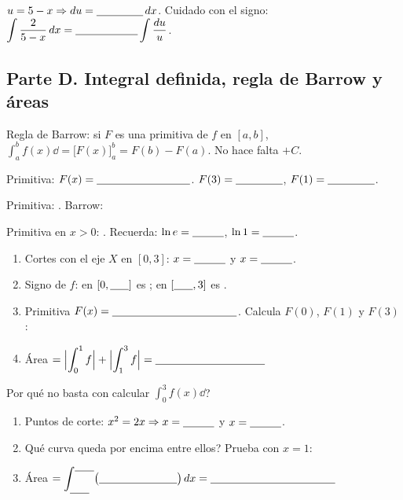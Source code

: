 \documentclass[11pt]{article}
\begin{document}
\(u=5-x\Rightarrow du=\hueco[1.5cm]\,dx\). Cuidado con el signo: \(\displaystyle\int\frac{2}{5-x}\dd=\hueco[2cm]\int\frac{du}{u}\).
\resultado\comprueba

\clearpage
\subsection*{Parte D. Integral definida, regla de Barrow y áreas}
\setcounter{ejercicio}{0}
Regla de Barrow: si \(F\) es una primitiva de \(f\) en \([a,b]\), \(\displaystyle\int_a^b f(x)\dd=\bigl[F(x)\bigr]_a^b=F(b)-F(a)\). No hace falta \(+C\).

Primitiva: \(F(x)=\hueco[3cm]\). \(F(3)=\hueco[1.5cm]\), \(F(1)=\hueco[1.5cm]\).
\resultado

Primitiva: \hueco[3cm]. Barrow: \hueco[6cm]
\resultado

Primitiva en \(x>0\): \hueco[3cm]. Recuerda: \(\ln e=\hueco[1cm]\), \(\ln1=\hueco[1cm]\).
\resultado

\begin{enumerate}[label=\alph*)]
  \item Cortes con el eje \(X\) en \([0,3]\): \(x=\hueco[1cm]\) y \(x=\hueco[1cm]\).
  \item Signo de \(f\): en \([0,\hueco[0.6cm]]\) es \hueco[2cm]; en \([\hueco[0.6cm],3]\) es \hueco[2cm].
  \item Primitiva \(F(x)=\hueco[4cm]\). Calcula \(F(0)\), \(F(1)\) y \(F(3)\): \hueco[4cm]
  \item Área \(=\Bigl|\displaystyle\int_0^1 f\Bigr|+\Bigl|\displaystyle\int_1^3 f\Bigr|=\hueco[3.5cm]\)
\end{enumerate}
\textquestiondown{}Por qué no basta con calcular \(\int_0^3 f(x)\dd\)? \hueco[7cm]

\begin{enumerate}[label=\alph*)]
  \item Puntos de corte: \(x^2=2x\Rightarrow x=\hueco[1cm]\) y \(x=\hueco[1cm]\).
  \item \textquestiondown{}Qué curva queda por encima entre ellos? Prueba con \(x=1\): \hueco[4cm]
  \item Área \(=\displaystyle\int_{\hueco[0.6cm]}^{\hueco[0.6cm]}\bigl(\hueco[2.5cm]\bigr)\dd=\hueco[4cm]\)
\end{enumerate}
\end{document}
